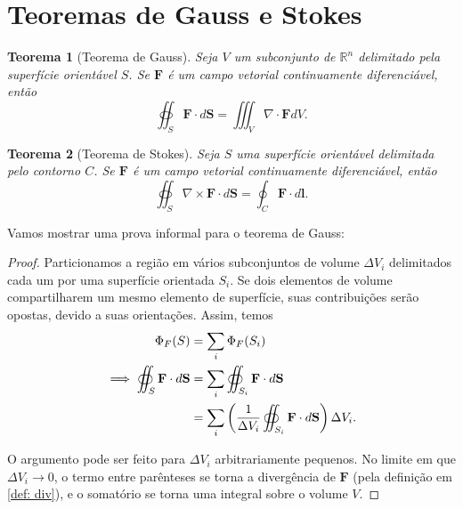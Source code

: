\section{Teoremas de Gauss e Stokes}

\renewcommand{\proofname}{Prova do teorema \ref{th: div}}
\newtheorem{theorem}{Teorema}

\begin{theorem}[Teorema de Gauss]
Seja $V$ um subconjunto de $\mathbb{R}^n$ delimitado pela superfície orientável $S$. Se $\mathbf F$ é um campo vetorial continuamente diferenciável, então 
\begin{equation}
\oiint_S \mathbf{F} \cdot d\mathbf{S} = \iiint_V \nabla \cdot \mathbf{F} dV.
\label{th: div}
\end{equation}
\end{theorem}

\begin{theorem}[Teorema de Stokes]
Seja $S$ uma superfície orientável delimitada pelo contorno $C$. Se $\mathbf{F}$ é um campo vetorial continuamente diferenciável, então
\begin{equation}
\oiint_S \nabla \times \mathbf{F} \cdot d\mathbf{S} = \oint_C \mathbf{F} \cdot d\mathbf{l}.
\label{th: stokes}
\end{equation}
\end{theorem}

Vamos mostrar uma prova informal para o teorema de Gauss:

\begin{proof}
Particionamos a região em vários subconjuntos de volume $\Delta V_i$ delimitados cada um por uma superfície orientada $S_i$. Se dois elementos de volume compartilharem um mesmo elemento de superfície, suas contribuições serão opostas, devido a suas orientações. Assim, temos 
\begin{align}
\Phi_F(S) &= \sum_i \Phi_F(S_i) \notag \\
\implies \oiint_{S} \mathbf{F} \cdot d\mathbf{S} &= \sum_i \oiint_{S_i} \mathbf{F} \cdot d\mathbf{S} \notag \\
&= \sum_i \left( \frac{1}{\Delta V_i} \oiint_{S_i} \mathbf{F} \cdot d\mathbf{S} \right) \Delta V_i.
\end{align}

\noindent O argumento pode ser feito para $\Delta V_i$ arbitrariamente pequenos. No limite em que $\Delta V_i \to 0$, o termo entre parênteses se torna a divergência de $\mathbf{F}$ (pela definição em \ref{def: div}), e o somatório se torna uma integral sobre o volume $V$.
\end{proof}

